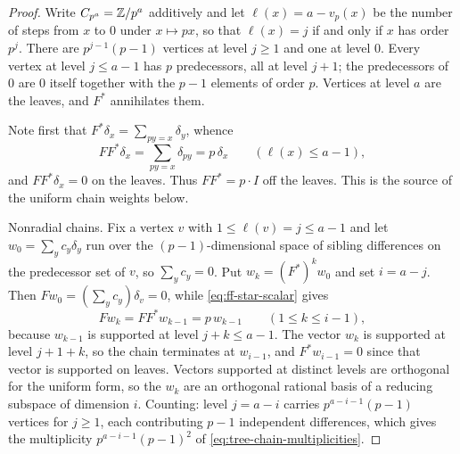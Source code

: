 \begin{proof}
Write \(C_{p^a}=\mathbb Z/p^a\) additively and let
\(\ell(x)=a-v_p(x)\) be the number of steps from \(x\) to \(0\) under
\(x\mapsto px\), so that \(\ell(x)=j\) if and only if \(x\) has order
\(p^j\).  There are \(p^{j-1}(p-1)\) vertices at level \(j\geq1\) and one at
level \(0\).  Every vertex at level \(j\leq a-1\) has \(p\)
predecessors, all at level \(j+1\); the predecessors of \(0\) are \(0\)
itself together with the \(p-1\) elements of order \(p\).  Vertices at
level \(a\) are the leaves, and \(F^*\) annihilates them.

Note first that \(F^*\delta_x=\sum_{py=x}\delta_y\), whence
\begin{equation}
 FF^*\delta_x
 =\sum_{py=x}\delta_{py}
 =p\,\delta_x
 \qquad(\ell(x)\leq a-1),
 \label{eq:ff-star-scalar}
\end{equation}
and \(FF^*\delta_x=0\) on the leaves.  Thus \(FF^*=p\cdot I\) off the
leaves.  This is the source of the uniform chain weights below.

Nonradial chains.  Fix a vertex \(v\) with \(1\leq\ell(v)=j\leq a-1\)
and let \(w_0=\sum_yc_y\delta_y\) run over the \((p-1)\)-dimensional space
of sibling differences on the predecessor set of \(v\), so
\(\sum_yc_y=0\).  Put \(w_k=(F^*)^kw_0\) and set \(i=a-j\).  Then \(Fw_0=(\sum_yc_y)\delta_v=0\),
while \eqref{eq:ff-star-scalar} gives
\begin{equation}
 Fw_k=FF^*w_{k-1}=p\,w_{k-1}
 \qquad(1\leq k\leq i-1),
 \label{eq:chain-weights}
\end{equation}
because \(w_{k-1}\) is supported at level \(j+k\leq a-1\).  The vector
\(w_k\) is supported at level \(j+1+k\), so the chain terminates at
\(w_{i-1}\), and \(F^*w_{i-1}=0\) since that vector is
supported on leaves.  Vectors supported at distinct levels are orthogonal
for the uniform form, so the \(w_k\) are an orthogonal rational basis of a
reducing subspace of dimension \(i\).  Counting: level \(j=a-i\) carries
\(p^{a-i-1}(p-1)\) vertices for \(j\geq1\), each contributing \(p-1\)
independent differences, which gives the multiplicity
\(p^{a-i-1}(p-1)^2\) of \eqref{eq:tree-chain-multiplicities}.


\end{proof}
